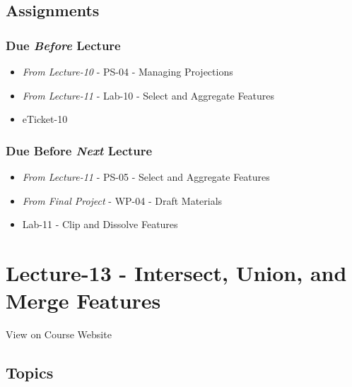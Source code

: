 \documentclass[]{book}
\providecommand{\tightlist}{%
  \setlength{\itemsep}{0pt}\setlength{\parskip}{0pt}}
\begin{document}
\hypertarget{assignments-13}{%
\subsection*{Assignments}\label{assignments-13}}

\hypertarget{due-before-lecture-11}{%
\subsubsection*{\texorpdfstring{Due \emph{Before} Lecture}{Due Before Lecture}}\label{due-before-lecture-11}}

\begin{itemize}
\tightlist
\item
  \emph{From Lecture-10} - PS-04 - Managing Projections
\item
  \emph{From Lecture-11} - Lab-10 - Select and Aggregate Features
\item
  eTicket-10
\end{itemize}

\hypertarget{due-before-next-lecture-10}{%
\subsubsection*{\texorpdfstring{Due Before \emph{Next} Lecture}{Due Before Next Lecture}}\label{due-before-next-lecture-10}}

\begin{itemize}
\tightlist
\item
  \emph{From Lecture-11} - PS-05 - Select and Aggregate Features
\item
  \emph{From Final Project} - WP-04 - Draft Materials
\item
  Lab-11 - Clip and Dissolve Features
\end{itemize}

\hypertarget{lecture-13---intersect-union-and-merge-features}{%
\section*{Lecture-13 - Intersect, Union, and Merge Features}\label{lecture-13---intersect-union-and-merge-features}}

View on Course Website

\hypertarget{topics-13}{%
\subsection*{Topics}\label{topics-13}}
\end{document}
